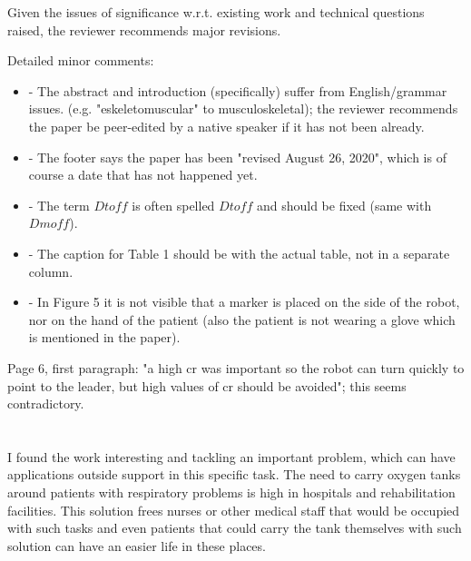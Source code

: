 \documentclass[journal,onecolumn,12pt]{IEEEtran}
\begin{document}
\vspace{2em}

Given the issues of significance w.r.t. existing work and technical questions raised, the reviewer recommends major revisions.  

\vspace{2em}

Detailed minor comments:

\begin{itemize}
\item - The abstract and introduction (specifically) suffer from English/grammar issues. (e.g. "eskeletomuscular" to musculoskeletal); the reviewer recommends the paper be peer-edited by a native speaker if it has not been already.
\item - The footer says the paper has been "revised August 26, 2020", which is of course a date that has not happened yet.
\item - The term $Dt{off}$ is often spelled $Dt{o}ff$ and should be fixed (same with $Dm{off}$).
\item - The caption for Table 1 should be with the actual table, not in a separate column.
\item - In Figure 5 it is not visible that a marker is placed on the side of the robot, nor on the hand of the patient (also the patient is not wearing a glove which is mentioned in the paper).
\end{itemize}


Page 6, first paragraph: "a high cr was important so the robot can turn quickly to point to the leader, but high values of cr should be avoided"; this seems contradictory.


\section*{}


I found the work interesting and tackling an important problem, which can have applications outside support in this specific task. The need to carry oxygen tanks around patients with respiratory problems is high in hospitals and rehabilitation facilities. This solution frees nurses or other medical staff that would be occupied with such tasks and even patients that could carry the tank themselves with such solution can have an easier life in these places.
\end{document}
